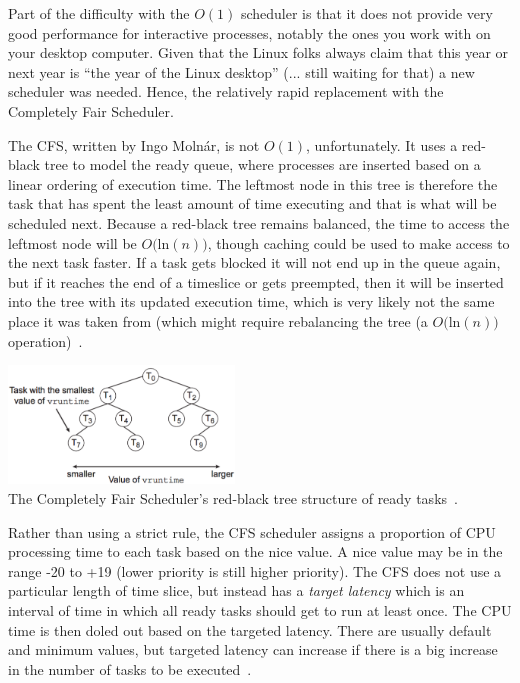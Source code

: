 Part of the difficulty with the $O(1)$ scheduler is that it does not provide very good performance for interactive processes, notably the ones you work with on your desktop computer. Given that the Linux folks always claim that this year or next year is ``the year of the Linux desktop'' (... still waiting for that) a new scheduler was needed. Hence, the relatively rapid replacement with the Completely Fair Scheduler.

The CFS, written by Ingo Moln\'ar, is not $O(1)$, unfortunately. It uses a red-black tree to model the ready queue, where processes are inserted based on a linear ordering of execution time. The leftmost node in this tree is therefore the task that has spent the least amount of time executing and that is what will be scheduled next. Because a red-black tree remains balanced, the time to access the leftmost node will be $O($ln$(n))$, though caching could be used to make access to the next task faster. If a task gets blocked it will not end up in the queue again, but if it reaches the end of a timeslice or gets preempted, then it will be inserted into the tree with its updated execution time, which is very likely not the same place it was taken from (which might require rebalancing the tree (a $O($ln$(n))$ operation)~\cite{mte241}.

\begin{center}
	\includegraphics[width=0.45\textwidth]{images/cfs.png}\\
	The Completely Fair Scheduler's red-black tree structure of ready tasks~\cite{osc}.
\end{center}

Rather than using a strict rule, the CFS scheduler assigns a proportion of CPU processing time to each task based on the nice value. A nice value may be in the range -20 to +19 (lower priority is still higher priority). The CFS does not use a particular length of time slice, but instead has a \textit{target latency} which is an interval of time in which all ready tasks should get to run at least once. The CPU time is then doled out based on the targeted latency. There are usually default and minimum values, but targeted latency can increase if there is a big increase in the number of tasks to be executed~\cite{osc}.

